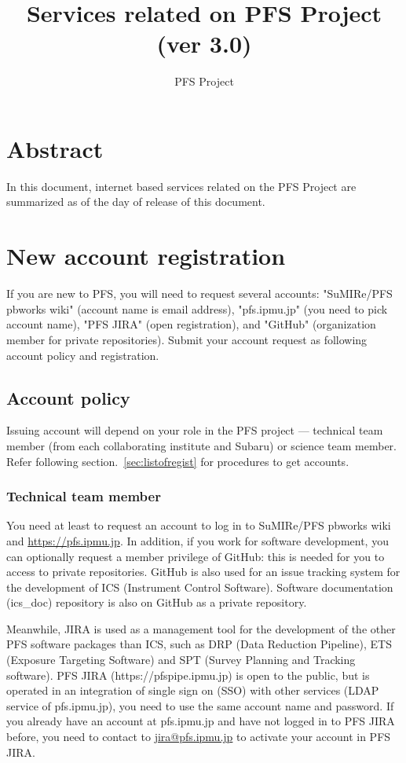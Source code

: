 \documentclass[a4paper,notitlepage]{article}
\title{Services related on PFS Project (ver 3.0)}
\author{PFS Project}
\begin{document}
\maketitle
\tableofcontents

\section{Abstract}

In this document, internet based services related on the PFS Project are summarized 
as of the day of release of this document. 

\section{New account registration}

If you are new to PFS, you will need to request several accounts: 
"SuMIRe/PFS pbworks wiki" (account name is email address), 
"pfs.ipmu.jp" (you need to pick account name), 
"PFS JIRA" (open registration), and 
"GitHub" (organization member for private repositories). 
Submit your account request as following account policy and registration. 

\subsection{Account policy}

Issuing account will depend on your role in the PFS project --- 
technical team member (from each collaborating institute and Subaru) 
or science team member. 
Refer following section.~\ref{sec:listofregist} for procedures to get accounts. 

\subsubsection{Technical team member}

You need at least to request an account to log in to 
SuMIRe/PFS pbworks wiki and \url{https://pfs.ipmu.jp}.
In addition, if you work for software development, you can optionally 
request a member privilege of GitHub: this is needed for you to access 
to private repositories. 
GitHub is also used for an issue tracking system for the development of 
ICS (Instrument Control Software). Software documentation (ics\_doc) 
repository is also on GitHub as a private repository. 

Meanwhile, JIRA is used as a management tool for the development of 
the other PFS software packages than ICS, such as DRP (Data Reduction 
Pipeline), ETS (Exposure Targeting Software) and SPT (Survey Planning 
and Tracking software). PFS JIRA (https://pfspipe.ipmu.jp) is open to 
the public, but is operated in an integration of single sign on (SSO) with 
other services (LDAP service of pfs.ipmu.jp), you need to use the same 
account name and password. If you already have an account at pfs.ipmu.jp 
and have not logged in to PFS JIRA before, you need to contact to 
\url{jira@pfs.ipmu.jp} to activate your account in PFS JIRA.
\end{document}
